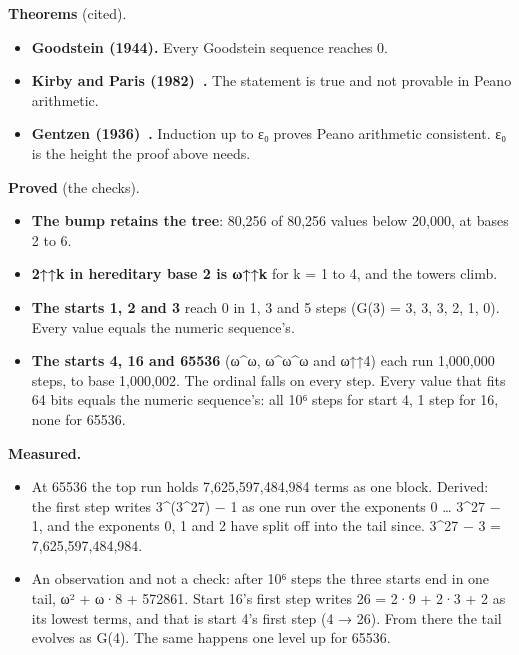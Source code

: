 \textbf{Theorems} (cited).

\begin{itemize}
\item \textbf{Goodstein (1944).} Every Goodstein sequence reaches 0.
\item \textbf{Kirby and Paris (1982)~\cite{src:Kirby-and-Paris-1982}.} The statement is true and not provable in Peano arithmetic.
\item \textbf{Gentzen (1936)~\cite{src:Gentzen-1936}.} Induction up to ε₀ proves Peano arithmetic consistent. ε₀ is the height the proof above needs.
\end{itemize}

\textbf{Proved} (the checks).

\begin{itemize}
\item \textbf{The bump retains the tree}: 80,256 of 80,256 values below 20,000, at bases 2 to 6.
\item \textbf{2↑↑k in hereditary base 2 is ω↑↑k} for k = 1 to 4, and the towers climb.
\item \textbf{The starts 1, 2 and 3} reach 0 in 1, 3 and 5 steps (G(3) = 3, 3, 3, 2, 1, 0). Every value equals the numeric sequence's.
\item \textbf{The starts 4, 16 and 65536} (ω\textasciicircum{}ω, ω\textasciicircum{}ω\textasciicircum{}ω and ω↑↑4) each run 1,000,000 steps, to base 1,000,002. The ordinal falls on every step. Every value that fits 64 bits equals the numeric sequence's: all 10⁶ steps for start 4, 1 step for 16, none for 65536.
\end{itemize}

\textbf{Measured.}

\begin{itemize}
\item At 65536 the top run holds 7,625,597,484,984 terms as one block. Derived: the first step writes 3\textasciicircum{}(3\textasciicircum{}27) − 1 as one run over the exponents 0 … 3\textasciicircum{}27 − 1, and the exponents 0, 1 and 2 have split off into the tail since. 3\textasciicircum{}27 − 3 = 7,625,597,484,984.
\item An observation and not a check: after 10⁶ steps the three starts end in one tail, ω² + ω·8 + 572861. Start 16's first step writes 26 = 2·9 + 2·3 + 2 as its lowest terms, and that is start 4's first step (4 → 26). From there the tail evolves as G(4). The same happens one level up for 65536.
\end{itemize}

